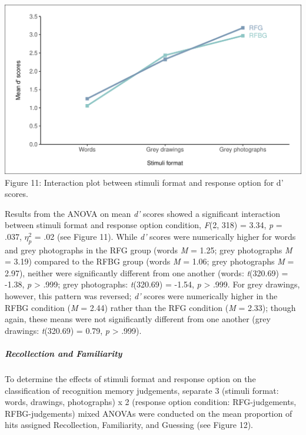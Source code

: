 \documentclass[
  11pt,
]{article}
\begin{document}
\includegraphics{R--Thesis_files/figure-latex/unnamed-chunk-32-1.pdf}
Figure 11: Interaction plot between stimuli format and response option
for d' scores. ~~

Results from the ANOVA on mean \emph{d'} scores showed a significant
interaction between stimuli format and response option condition,
\emph{F}(2, 318) = 3.34, \emph{p} = .037, \(\eta^2_p\) = .02 (see Figure
11). While \emph{d'} scores were numerically higher for words and grey
photographs in the RFG group (words \emph{M} = 1.25; grey photographs
\emph{M} = 3.19) compared to the RFBG group (words \emph{M} = 1.06; grey
photographs \emph{M} = 2.97), neither were significantly different from
one another (words: \emph{t}(320.69) = -1.38, \emph{p} \textgreater{}
.999; grey photographs: \emph{t}(320.69) = -1.54, \emph{p}
\textgreater{} .999. For grey drawings, however, this pattern was
reversed; \emph{d'} scores were numerically higher in the RFBG condition
(\emph{M} = 2.44) rather than the RFG condition (\emph{M} = 2.33);
though again, these means were not significantly different from one
another (grey drawings: \emph{t}(320.69) = 0.79, \emph{p} \textgreater{}
.999).

\hypertarget{recollection-and-familiarity}{%
\subparagraph{Recollection and
Familiarity}\label{recollection-and-familiarity}}

To determine the effects of stimuli format and response option on the
classification of recognition memory judgements, separate 3 (stimuli
format: words, drawings, photographs) x 2 (response option condition:
RFG-judgements, RFBG-judgements) mixed ANOVAs were conducted on the mean
proportion of hits assigned Recollection, Familiarity, and Guessing (see
Figure 12).
\end{document}
